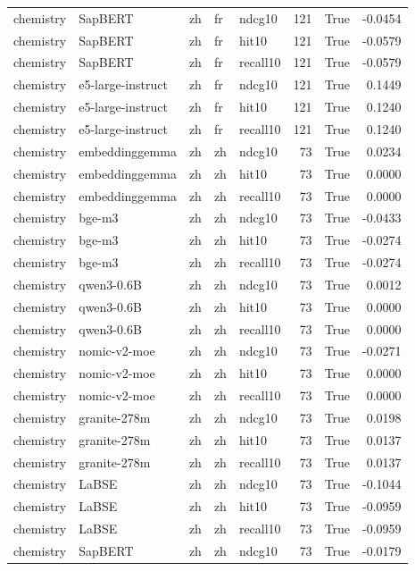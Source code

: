 \begin{tabular}{lllllrrr}
chemistry & SapBERT & zh & fr & ndcg10 & 121 & True & -0.0454 \\
chemistry & SapBERT & zh & fr & hit10 & 121 & True & -0.0579 \\
chemistry & SapBERT & zh & fr & recall10 & 121 & True & -0.0579 \\
chemistry & e5-large-instruct & zh & fr & ndcg10 & 121 & True & 0.1449 \\
chemistry & e5-large-instruct & zh & fr & hit10 & 121 & True & 0.1240 \\
chemistry & e5-large-instruct & zh & fr & recall10 & 121 & True & 0.1240 \\
chemistry & embeddinggemma & zh & zh & ndcg10 & 73 & True & 0.0234 \\
chemistry & embeddinggemma & zh & zh & hit10 & 73 & True & 0.0000 \\
chemistry & embeddinggemma & zh & zh & recall10 & 73 & True & 0.0000 \\
chemistry & bge-m3 & zh & zh & ndcg10 & 73 & True & -0.0433 \\
chemistry & bge-m3 & zh & zh & hit10 & 73 & True & -0.0274 \\
chemistry & bge-m3 & zh & zh & recall10 & 73 & True & -0.0274 \\
chemistry & qwen3-0.6B & zh & zh & ndcg10 & 73 & True & 0.0012 \\
chemistry & qwen3-0.6B & zh & zh & hit10 & 73 & True & 0.0000 \\
chemistry & qwen3-0.6B & zh & zh & recall10 & 73 & True & 0.0000 \\
chemistry & nomic-v2-moe & zh & zh & ndcg10 & 73 & True & -0.0271 \\
chemistry & nomic-v2-moe & zh & zh & hit10 & 73 & True & 0.0000 \\
chemistry & nomic-v2-moe & zh & zh & recall10 & 73 & True & 0.0000 \\
chemistry & granite-278m & zh & zh & ndcg10 & 73 & True & 0.0198 \\
chemistry & granite-278m & zh & zh & hit10 & 73 & True & 0.0137 \\
chemistry & granite-278m & zh & zh & recall10 & 73 & True & 0.0137 \\
chemistry & LaBSE & zh & zh & ndcg10 & 73 & True & -0.1044 \\
chemistry & LaBSE & zh & zh & hit10 & 73 & True & -0.0959 \\
chemistry & LaBSE & zh & zh & recall10 & 73 & True & -0.0959 \\
chemistry & SapBERT & zh & zh & ndcg10 & 73 & True & -0.0179 \\

\end{tabular}
